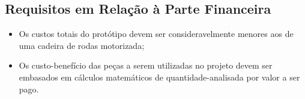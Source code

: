 \subsection{Requisitos em Relação à Parte Financeira}
  \begin{itemize}
    \item Os custos totais do protótipo devem ser consideravelmente menores aos de uma cadeira de rodas motorizada;
    \item Os custo-benefício das peças a serem utilizadas no projeto devem ser embasados em cálculos matemáticos de quantidade-analisada por valor a ser pago.
  \end{itemize}

